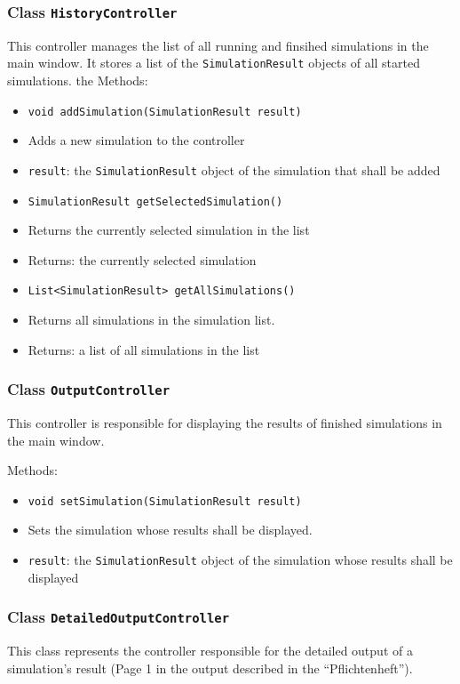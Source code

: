 \documentclass[parskip=full,11pt]{scrartcl}
\begin{document}
\subsubsection{Class \texttt{HistoryController}}
This controller manages the list of all running and finsihed simulations in the main window. It stores a list of the \texttt{SimulationResult} objects of all started simulations.
the
Methods:
\begin{itemize}\itemsep -10pt
\item \texttt{void addSimulation(SimulationResult result)}
\item[] Adds a new simulation to the controller
\item[] \texttt{result}: the \texttt{SimulationResult} object of the simulation that shall be added

\item \texttt{SimulationResult getSelectedSimulation()}
\item[] Returns the currently selected simulation in the list
\item[] Returns: the currently selected simulation

\item \texttt{List<SimulationResult> getAllSimulations()}
\item[] Returns all simulations in the simulation list.
\item[] Returns: a list of all simulations in the list
\end{itemize}

\subsubsection{Class \texttt{OutputController}}
This controller is responsible for displaying the results of finished simulations in the main window.

Methods:
\begin{itemize}\itemsep -10pt
\item \texttt{void setSimulation(SimulationResult result)}
\item[] Sets the simulation whose results shall be displayed.
\item[] \texttt{result}: the \texttt{SimulationResult} object of the simulation whose results shall be displayed

\end{itemize}

\subsubsection{Class \texttt{DetailedOutputController}}
This class represents the controller responsible for the detailed output of a simulation's result (Page 1 in the output described in the \enquote{Pflichtenheft}).
\end{document}
